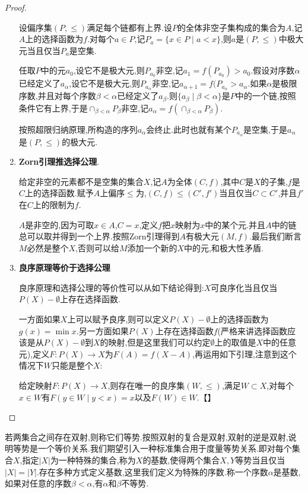 \begin{proof}
\begin{enumerate}
		设偏序集$(P,\le)$满足每个链都有上界.设$P$的全体非空子集构成的集合为$A$,记$A$上的选择函数为$f$.对每个$a\in P$,记$P_a=\{x\in P\mid a<x\}$,则$a$是$(P,\le)$中极大元当且仅当$P_a$是空集.
		
		任取$P$中的元$a_0$,设它不是极大元,则$P_{a_0}$非空,记$a_1=f(P_{a_0})>a_0$.假设对序数$\alpha$已经定义了$a_{\alpha}$,设它不是极大元,则$P_{a_{\alpha}}$非空,记$a_{\alpha+1}=f(P_{a_{\alpha}}>a_{\alpha}$.如果$\alpha$是极限序数,并且对每个序数$\beta<\alpha$已经定义了$a_{\beta}$.则$\{a_{\beta}\mid\beta<\alpha\}$是$P$中的一个链,按照条件它有上界,于是$\cap_{\beta<\alpha}P_{\beta}$非空,记$a_{\alpha}=f(\cap_{\beta<\alpha}P_{\beta})$.
		
		按照超限归纳原理,所构造的序列$a_{\alpha}$会终止.此时也就有某个$P_{a_{\alpha}}$是空集,于是$a_{\alpha}$是$(P,\le)$的极大元.
		\item\textbf{Zorn引理推选择公理}.
		
		给定非空的元素都不是空集的集合$X$,记$A$为全体$(C,f)$,其中$C$是$X$的子集,$f$是$C$上的选择函数.赋予$A$上偏序$\le$为,$(C,f)\le(C',f')$当且仅当$C\subset C'$,并且$f'$在$C$上的限制为$f$.
		
		$A$是非空的,因为可取$x\in A$,$C={x}$,定义$f$把${x}$映射为$x$中的某个元.并且$A$中的链总可以取并得到一个上界.按照Zorn引理得到$A$有极大元$(M,f)$.最后我们断言$M$必然是整个$X$,否则可以给$M$添加一个新的$X$中的元,和极大性矛盾.
		
		\item\textbf{良序原理等价于选择公理}
		
		良序原理和选择公理的等价性可以从如下结论得到:$X$可良序化当且仅当$P(X)-\emptyset$上存在选择函数.
		
		一方面如果$X$上可以赋予良序,则可以定义$P(X)-\emptyset$上的选择函数为$g(x)=\min x$.另一方面如果$P(X)$上存在选择函数$f$(严格来讲选择函数应该是从$P(X)-\emptyset$到$X$的映射,但是这里我们可以约定$\emptyset$上的取值是$X$中的任意元),定义$F:P(X)\to X$为$F(A)=f(X-A)$,再运用如下引理,注意到这个情况下$W$只能是整个$X$:
		
		给定映射$F:P(X)\to X$,则存在唯一的良序集$(W,\le)$,满足$W\subset X$,对每个$x\in W$有$F({y\in W\mid y<x})=x$以及$F(W)\in W$.【】
	\end{enumerate}
\end{proof}

若两集合之间存在双射,则称它们等势.按照双射的复合是双射,双射的逆是双射,说明等势是一个等价关系.我们期望引入一种标准集合用于度量等势关系.即对每个集合$X$,指定$|X|$为一种特殊的集合,称为$X$的基数,使得两个集合$X,Y$等势当且仅当$|X|=|Y|$.存在多种方式定义基数,这里我们定义为特殊的序数.称一个序数$\alpha$是基数,如果对任意的序数$\beta<\alpha$,有$\alpha$和$\beta$不等势.

